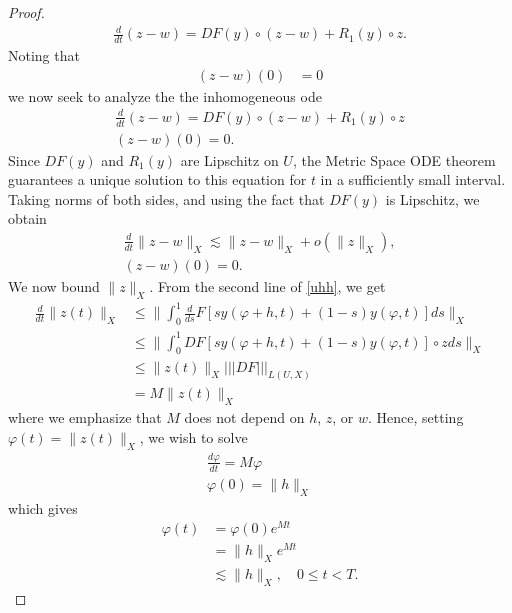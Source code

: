 \documentclass[12pt,reqno]{amsart}
\numberwithin{equation}{section}  %
\newcommand{\vp}{\varphi}
\begin{document}
\begin{proof}
\begin{equation*}
\begin{split}
\frac{d}{dt}(z-w) = DF(y) \circ (z-w) + R_{1}(y) \circ z.
\end{split}
\end{equation*}
%
%
Noting that %
%
\begin{equation*}
\begin{split}
(z-w)(0) & = 0
\end{split}
\end{equation*}
%
%
we now seek to analyze the the inhomogeneous ode
%
%
\begin{gather}
\frac{d}{dt}(z-w)  = DF(y) \circ (z-w) + R_{1}(y) \circ z
\label{inhom-ode}
\\
(z-w)(0) = 0.
\label{inhom-ode-init}
\end{gather}
%
Since $DF(y)$ and $R_{1}(y)$ are Lipschitz on $U$, the Metric Space ODE theorem
guarantees a unique solution to this equation for $t$ in a sufficiently small
interval. Taking norms of both sides, and using the fact that $DF(y)$ is
Lipschitz, we obtain
%
%
%
%
\begin{gather}
\label{yt}
\frac{d}{dt} \| z - w \|_{X} \lesssim  \| z - w \|_{X}  + o(\|z\|_{X}),
\\
(z-w)(0) = 0.
\label{ytt}
\end{gather}
%
We now bound $\| z \|_{X}$. From the
second line of \eqref{uhh}, we get
%
%
\begin{equation*}
\begin{split}
\frac{d}{dt} \| z(t) \|_{X}
& \le \| \int_{0}^{1} \frac{d}{ds} F\left[ sy(\vp+h, t) + (1-s)y(\vp,t) \right]ds
\|_{X}
\\
& \le \| \int_{0}^{1} DF\left[  sy(\vp+h, t) + (1-s)y(\vp,t) \right] \circ z ds
\|_{X}
\\
& \le \| z(t) \|_{X} | | | DF | | |_{L(U, X)}
\\
& = M \| z(t) \|_{X}
\end{split}
\end{equation*}
%
where we emphasize that $M$ does not depend on $h$, $z$, or $w$.
Hence, setting $\vp(t) =  \| z(t) \|_{X}$, we wish to solve
%
%
\begin{gather*}
\frac{d \vp}{dt} = M \vp
\\
\vp(0) = \| h \|_{X}
\end{gather*}
%
%
which gives
%
%
\begin{equation*}
\begin{split}
\vp(t) & = \vp(0)e^{Mt}
\\
& = \| h \|_{X} e^{Mt}
\\
& \lesssim \| h \|_{X}, \quad 0 \le t < T.

\end{split}
\end{equation*}
\end{proof}
\end{document}
